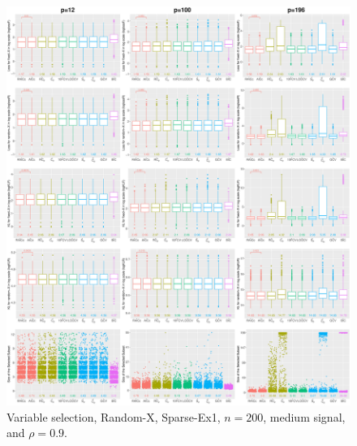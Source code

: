 \begin{figure}[!ht]
\centering
\includegraphics[width=\textwidth]{figures/supplement/randomx/subset_selection/Sparse-Ex1_n200_msnr_rho09.eps}
\caption{Variable selection, Random-X, Sparse-Ex1, $n=200$, medium signal, and $\rho=0.9$.}
\end{figure}
\clearpage
